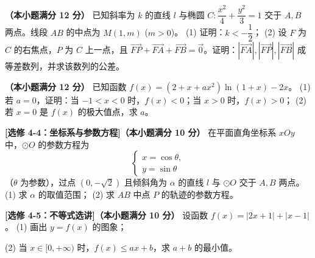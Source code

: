 \begin{question}
\textbf{（本小题满分 12 分）} 
已知斜率为 $k$ 的直线 $l$ 与椭圆 $C: \dfrac{x^2}{4} + \dfrac{y^2}{3} = 1$ 交于 $A, B$ 两点。线段 $AB$ 的中点为 $M(1, m)$ ($m > 0$)。
(1) 证明：$k < -\dfrac12$；
(2) 设 $F$ 为 $C$ 的右焦点，$P$ 为 $C$ 上一点，且 $\overrightarrow{FP} + \overrightarrow{FA} + \overrightarrow{FB} = \vec 0$。证明：$|\overrightarrow{FA}|, |\overrightarrow{FP}|, |\overrightarrow{FB}|$ 成等差数列，并求该数列的公差。

\end{question}
\begin{question}
\textbf{（本小题满分 12 分）} 
已知函数 $f(x) = (2 + x + ax^2)\ln(1 + x) - 2x$。
(1) 若 $a = 0$，证明：当 $-1 < x < 0$ 时，$f(x) < 0$；当 $x > 0$ 时，$f(x) > 0$；
(2) 若 $x = 0$ 是 $f(x)$ 的极大值点，求 $a$。

\par\medskip

\end{question}

\begin{question}
\textbf{[选修 4-4：坐标系与参数方程]（本小题满分 10 分）} 
在平面直角坐标系 $xOy$ 中，$\odot O$ 的参数方程为
\nopagebreak[4]
\[
\begin{cases}
x = \cos\theta, \\
y = \sin\theta
\end{cases}
\]
（$\theta$ 为参数），过点 $(0, -\sqrt2)$ 且倾斜角为 $\alpha$ 的直线 $l$ 与 $\odot O$ 交于 $A, B$ 两点。
(1) 求 $\alpha$ 的取值范围；
(2) 求 $AB$ 中点 $P$ 的轨迹的参数方程。

\Needspace{0.4\textheight}
\end{question}
\begin{question}
\textbf{[选修 4-5：不等式选讲]（本小题满分 10 分）} 
设函数 $f(x) = |2x + 1| + |x - 1|$。
(1) 画出 $y = f(x)$ 的图象；
\nopagebreak[4]
\begin{center}\end{center}
\nopagebreak[4]
(2) 当 $x \in [0, +\infty)$ 时，$f(x) \leqslant ax + b$，求 $a + b$ 的最小值。

\end{question}